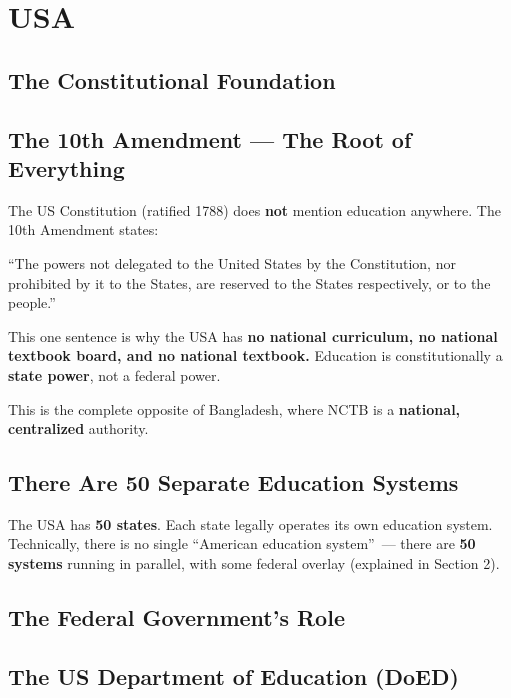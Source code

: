 \chapter{USA}

\section{The Constitutional Foundation}

\section{The 10th Amendment --- The Root of Everything}

The US Constitution (ratified 1788) does \textbf{not} mention education anywhere. The 10th Amendment states:

\begin{important}
	``The powers not delegated to the United States by the Constitution, nor prohibited by it to the States, are reserved to the States respectively, or to the people.''
\end{important}

This one sentence is why the USA has \textbf{no national curriculum, no national textbook board, and no national textbook.} Education is constitutionally a \textbf{state power}, not a federal power.

This is the complete opposite of Bangladesh, where NCTB is a \textbf{national, centralized} authority.

\section{There Are 50 Separate Education Systems}

The USA has \textbf{50 states}. Each state legally operates its own education system. Technically, there is no single ``American education system''~--- there are \textbf{50 systems} running in parallel, with some federal overlay (explained in Section 2).

\section{The Federal Government's Role}

\section{The US Department of Education (DoED)}

